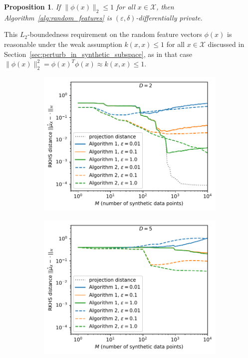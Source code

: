 \documentclass{article}
\newcommand{\calX}{\mathcal{X}}			%
\theoremstyle{plain}
\newtheorem{proposition}[theorem]{Proposition}
\theoremstyle{remark}
\theoremstyle{definition}
\begin{document}
\begin{proposition}
	\label{prop:random_features_privacy}
	If $\| \phi(x) \|_2 \leq 1$ for all $x \in \calX$, then Algorithm~\ref{alg:random_features} is $(\varepsilon, \delta)$-differentially private.
\end{proposition}

This $L_2$-boundedness requirement on the random feature vectors $\phi(x)$ is reasonable under the weak assumption $k(x, x) \leq 1$ for all $x \in \calX$ discussed in Section~\ref{sec:perturb_in_synthetic_subspace}, as in that case $\| \phi(x) \|_2^2 = \phi(x)^T \phi(x) \approx k(x, x) \leq 1$.

\begin{figure}[!t]
	\centering
	\begin{subfigure}{.5\linewidth}
		\includegraphics[width=0.92\linewidth]{../figures/nodataD2.pdf}
	\end{subfigure}%
	\begin{subfigure}{.5\linewidth}
		\includegraphics[width=0.92\linewidth]{../figures/nodataD5.pdf}

\end{subfigure}
\end{figure}
\end{document}
